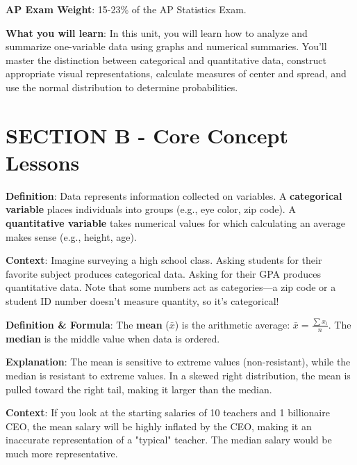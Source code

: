 \textbf{AP Exam Weight}: 15-23\% of the AP Statistics Exam.

\textbf{What you will learn}: In this unit, you will learn how to analyze and summarize one-variable data using graphs and numerical summaries. You'll master the distinction between categorical and quantitative data, construct appropriate visual representations, calculate measures of center and spread, and use the normal distribution to determine probabilities.

\section{SECTION B - Core Concept Lessons}

\begin{lessonbox}
\textbf{Definition}: Data represents information collected on variables. A \textbf{categorical variable} places individuals into groups (e.g., eye color, zip code). A \textbf{quantitative variable} takes numerical values for which calculating an average makes sense (e.g., height, age).

\textbf{Context}: Imagine surveying a high school class. Asking students for their favorite subject produces categorical data. Asking for their GPA produces quantitative data. Note that some numbers act as categories—a zip code or a student ID number doesn't measure quantity, so it's categorical!
\end{lessonbox}

\begin{lessonbox}
\textbf{Definition \& Formula}:
The \textbf{mean} ($\bar{x}$) is the arithmetic average: $\bar{x} = \frac{\sum x_i}{n}$.
The \textbf{median} is the middle value when data is ordered.

\textbf{Explanation}: The mean is sensitive to extreme values (non-resistant), while the median is resistant to extreme values. In a skewed right distribution, the mean is pulled toward the right tail, making it larger than the median.

\textbf{Context}: If you look at the starting salaries of 10 teachers and 1 billionaire CEO, the mean salary will be highly inflated by the CEO, making it an inaccurate representation of a "typical" teacher. The median salary would be much more representative.
\end{lessonbox}

